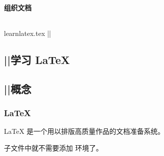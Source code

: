 \begin{frame}[fragile]
  \frametitle{组织文档}
  \begin{columns}
    \begin{column}{0.4\textwidth}
      \begin{codeblock}[]{learnlatex.tex}
|\highlightline|\chapter{||学习 \LaTeX{}}
\section{||概念}
\subsection{\LaTeX{}}
\LaTeX{} 是一个用以排版高质量作品的文档准备系统。
      \end{codeblock}
      子文件中就不需要添加  环境了\footnotemark。
    \end{column}
    \begin{column}{0.6\textwidth}
    \end{column}
  \end{columns}
\end{frame}

